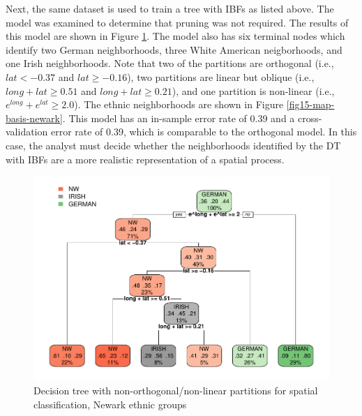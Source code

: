 \documentclass[]{elsarticle} %
\makeatletter
\def\maxwidth{\ifdim\Gin@nat@width>\linewidth\linewidth
\else\Gin@nat@width\fi}
\let\Oldincludegraphics\includegraphics
\renewcommand{\includegraphics}[1]{\Oldincludegraphics[width=\maxwidth]{#1}}
\makeatother
\begin{document}
Next, the same dataset is used to train a tree with IBFs as listed
above. The model was examined to determine that pruning was not
required. The results of this model are shown in Figure
\ref{fig14-tree-basis-newark}. The model also has six terminal nodes
which identify two German neighborhoods, three White American
neigborhoods, and one Irish neighborhoods. Note that two of the
partitions are orthogonal (i.e., \(lat < -0.37\) and \(lat \ge -0.16\)),
two partitions are linear but oblique (i.e., \(long+lat \ge 0.51\) and
\(long+lat \ge 0.21\)), and one partition is non-linear (i.e.,
\(e^{long}+e^{lat} \ge 2.0\)). The ethnic neighborhoods are shown in
Figure \ref{fig15-map-basis-newark}. This model has an in-sample error
rate of 0.39 and a cross-validation error rate of 0.39, which is
comparable to the orthogonal model. In this case, the analyst must
decide whether the neighborhoods identified by the DT with IBFs are a
more realistic representation of a spatial process.

\begin{figure}[htbp]
\centering
\includegraphics{Trees_with_Base_Functions_files/figure-latex/fig14-tree-basis-newark-1.pdf}
\caption{\label{fig14-tree-basis-newark}Decision tree with
non-orthogonal/non-linear partitions for spatial classification, Newark
ethnic groups}
\end{figure}
\end{document}
